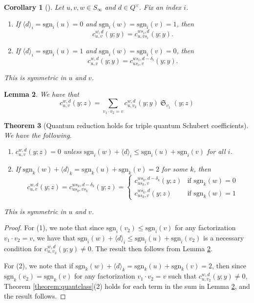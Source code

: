 \documentclass{amsart}
\newtheorem{lemma}{Lemma}[section]
\newtheorem{corollary}[lemma]{Corollary}
\newtheorem{theorem}[lemma]{Theorem}
\theoremstyle{definition}
\theoremstyle{remark}
\numberwithin{equation}{section}
\DeclareMathOperator{\sch}{\mathfrak{S}}
\begin{document}
\begin{corollary}[{\cite[Corollary~2.8]{huang2015equivariant}}] \label{corollary:quantclass28}
	Let $u,v,w\in S_\infty$ and $d\in Q^\vee$. Fix an index $i$.
	\begin{enumerate}
	\item If $\langle d\rangle_i=\mathrm{sgn}_i(u)=0$ and $\mathrm{sgn}_i(w)=\mathrm{sgn}_i(v)=1$, then
	$$c_{u,v}^{w,d}(y;y)=c_{u,vs_i}^{ws_i,d}(y;y).$$
	\item If $\langle d\rangle_i=\mathrm{sgn}_i(u)=1$ and $\mathrm{sgn}_i(w)=\mathrm{sgn}_i(v)=0$, then
	$$c_{u,v}^{w,d}(y;y)=c_{us_i,v}^{ws_i,d-\delta_i}(y;y).$$
	\end{enumerate}
	This is symmetric in $u$ and $v$.
\end{corollary}

\begin{lemma} \label{lemma:quantumtoordinary}
We have that
$$c_{u,v}^{w,d}(y;z)=\sum_{v_1\cdot v_2=v}c_{u,v_2}^{w,d}(y;y)\sch_{v_1}(y;z)$$
\end{lemma}

\begin{theorem}[Quantum reduction holds for triple quantum Schubert coefficients]\label{theorem:quantclassz}
We have the following.
	\begin{enumerate}
	\item $c_{u,v}^{w,d}(y;z)=0$ unless $\mathrm{sgn}_i(w)+\langle d\rangle_i\leq \mathrm{sgn}_i(u)+\mathrm{sgn}_i(v)$ for all $i$.
	\item If $\mathrm{sgn}_k(w)+\langle d\rangle_k=\mathrm{sgn}_k(u)+\mathrm{sgn}_k(v)=2$ for some $k$, then
	$$c_{u,v}^{w,d}(y;z)=c_{us_k,vs_k}^{ws_k,d-\delta_k}(y;z)=\begin{cases}
	c_{us_k,v}^{ws_k,d-\delta_k}(y;z) & \text{if $\mathrm{sgn}_k(w)=0$}\\
	c_{us_k,v}^{ws_k,d}(y;z) & \text{if $\mathrm{sgn}_k(w)=1$}
	\end{cases}$$
	\end{enumerate}
	This is symmetric in $u$ and $v$.
\end{theorem}
\begin{proof}
For (1), we note that since $\mathrm{sgn}_i(v_2)\leq \mathrm{sgn}_i(v)$ for any factorization $v_1\cdot v_2=v$, we have that $\mathrm{sgn}_i(w)+\langle d\rangle_i\leq \mathrm{sgn}_i(u)+\mathrm{sgn}_i(v_2)$ is a necessary condition for $c_{u,v_2}^{w,d}(y;y)\neq 0$. The result then follows from Lemma \ref{lemma:quantumtoordinary}.

For (2), we note that if $\mathrm{sgn}_k(w)+\langle d\rangle_k=\mathrm{sgn}_k(u)+\mathrm{sgn}_k(v)=2$, then since $\mathrm{sgn}_k(v_2)=\mathrm{sgn}_k(v)$ for any factorization $v_1\cdot v_2=v$ such that $c_{u,v_2}^{w,d}(y;y)\neq 0$, Theorem \ref{theorem:quantclass}(2) holds for each term in the sum in Lemma \ref{lemma:quantumtoordinary}, and the result follows.
\end{proof}
\end{document}
